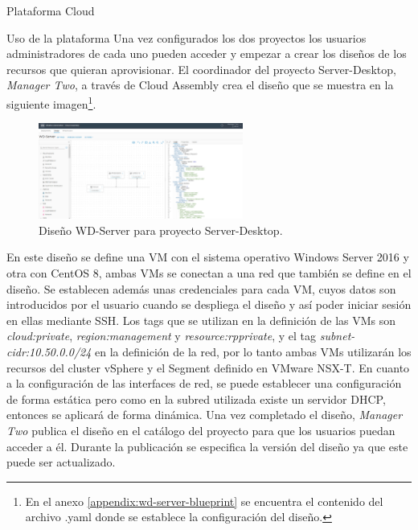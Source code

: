\begin{subsection}{Plataforma Cloud}
\begin{subsubsection}{Uso de la plataforma}
        Una vez configurados los dos proyectos los usuarios administradores de cada uno pueden acceder y empezar a crear los diseños de los recursos que quieran aprovisionar. El coordinador del proyecto Server-Desktop, \textit{Manager Two}, a través de Cloud Assembly crea el diseño que se muestra en la siguiente imagen\footnote{En el anexo \ref{appendix:wd-server-blueprint} se encuentra el contenido del archivo .yaml donde se establece la configuración del diseño.}.
        \begin{figure}[h]
            \centering
            \includegraphics[width=0.6\textwidth]{imaxes/pruebaconcepto/vrealize/windows-centos-blueprint.png}
            \caption{Diseño WD-Server para proyecto Server-Desktop.}
            \label{fig:server-desktop-blueprint}
        \end{figure}
        \FloatBarrier
        En este diseño se define una VM con el sistema operativo Windows Server 2016 y otra con CentOS 8, ambas VMs se conectan a una red que también se define en el diseño. Se establecen además unas credenciales para cada VM, cuyos datos son introducidos por el usuario cuando se despliega el diseño y así poder iniciar sesión en ellas mediante SSH. Los tags que se utilizan en la definición de las VMs son \textit{cloud:private}, \textit{region:management} y \textit{resource:rpprivate}, y el tag \textit{subnet-cidr:10.50.0.0/24} en la definición de la red, por lo tanto ambas VMs utilizarán los recursos del cluster vSphere y el Segment definido en VMware NSX-T. En cuanto a la configuración de las interfaces de red, se puede establecer una configuración de forma estática pero como en la subred utilizada existe un servidor DHCP, entonces se aplicará de forma dinámica. Una vez completado el diseño, \textit{Manager Two} publica el diseño en el catálogo del proyecto para que los usuarios puedan acceder a él. Durante la publicación se especifica la versión del diseño ya que este puede ser actualizado.
        \begin{figure}[h]
            \centering

\end{figure}
\end{subsubsection}
\end{subsection}
